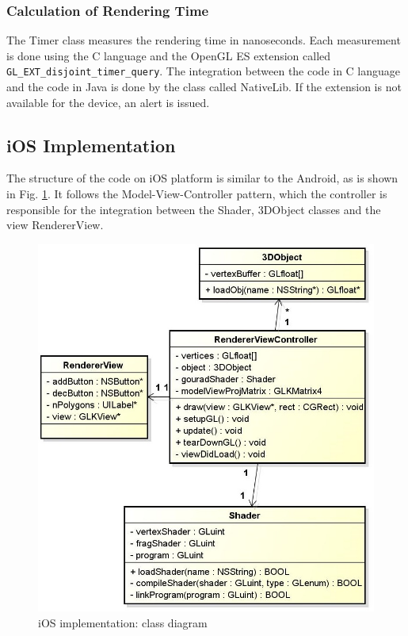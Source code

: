 \documentclass[10pt, conference, compsocconf]{IEEEtran}
\begin{document}
{	

\subsubsection{Calculation of Rendering Time}
\label{time}
The Timer class measures the rendering time in nanoseconds. Each measurement is
done using the C language and the OpenGL ES extension called 
\texttt{GL\_EXT\_disjoint\_timer\_query}. The integration between the code in C 
language and the code in Java is done by the class called NativeLib. If the
extension is not available for the device, an alert is issued.

\subsection{iOS Implementation}
\label{sec:ios}

The structure of the code on iOS platform is similar to the Android, as is 
shown in Fig. \ref{ios_diag}. It follows the Model-View-Controller pattern, which the
controller is responsible for the integration between the Shader, 3DObject
classes and the view RendererView. 

	\begin{figure}[!t]
	\centering
		\includegraphics[keepaspectratio=true,scale=0.41]{ios_class_diagram.jpg}
	\caption{iOS implementation: class diagram}
	\label{ios_diag}
	\end{figure}

}
\end{document}
